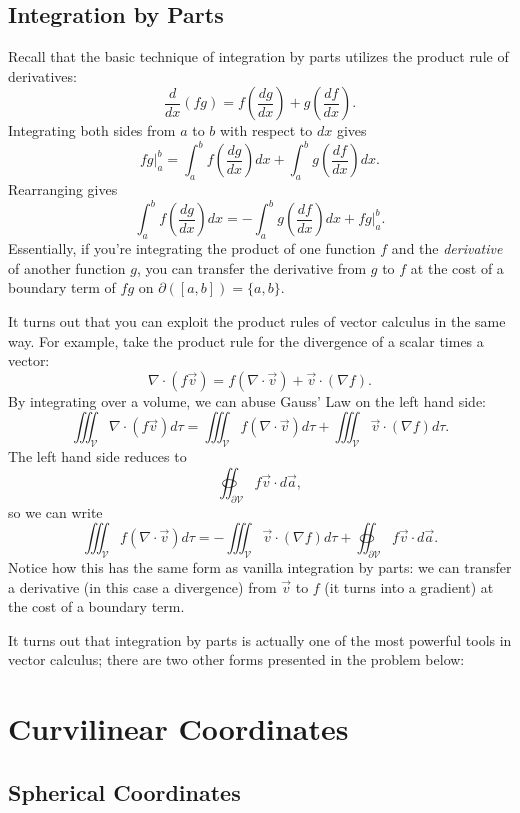 \subsection{Integration by Parts}

Recall that the basic technique of integration by parts utilizes the product rule of derivatives:
\[\frac{d}{dx}(fg)=f\left(\frac{dg}{dx}\right)+g\left(\frac{df}{dx}\right).\]
Integrating both sides from $a$ to $b$ with respect to $dx$ gives
\[\left.fg\right\rvert_{a}^b=\int_a^bf\left(\frac{dg}{dx}\right)dx+\int_a^bg\left(\frac{df}{dx}\right)dx.\]
Rearranging gives
\[\boxed{\int_a^bf\left(\frac{dg}{dx}\right)dx=-\int_a^bg\left(\frac{df}{dx}\right)dx+\left.fg\right\rvert_a^b}.\]
Essentially, if you're integrating the product of one function $f$ and the \textit{derivative} of another function $g$, you can transfer the derivative from $g$ to $f$ at the cost of a boundary term of $fg$ on $\partial([a,b])=\{a,b\}$.

It turns out that you can exploit the product rules of vector calculus in the same way. For example, take the product rule for the divergence of a scalar times a vector:
\[\nabla\cdot(f\vec{v})=f(\nabla\cdot \vec{v})+\vec{v}\cdot(\nabla f).\]
By integrating over a volume, we can abuse Gauss' Law on the left hand side:
\[\iiint_{\mathcal{V}}\nabla\cdot(f\vec{v})d\tau=\iiint_{\mathcal{V}}f(\nabla\cdot \vec{v})d\tau+\iiint_{\mathcal{V}}\vec{v}\cdot(\nabla f)d\tau.\]
The left hand side reduces to
\[\oiint_{\partial\mathcal{V}}f\vec{v}\cdot d\vec{a},\]
so we can write
\[\boxed{\iiint_{\mathcal{V}}f(\nabla\cdot\vec{v})d\tau=-\iiint_{\mathcal{V}}\vec{v}\cdot(\nabla f)d\tau+\oiint_{\partial\mathcal{V}}f\vec{v}\cdot d\vec{a}}.\]
Notice how this has the same form as vanilla integration by parts: we can transfer a derivative (in this case a divergence) from $\vec{v}$ to $f$ (it turns into a gradient) at the cost of a boundary term.

It turns out that integration by parts is actually one of the most powerful tools in vector calculus; there are two other forms presented in the problem below:

\section{Curvilinear Coordinates}

\subsection{Spherical Coordinates}

